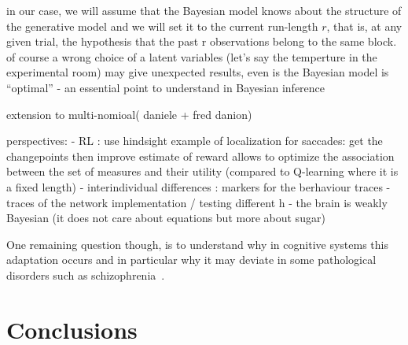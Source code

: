 \documentclass[12pt,english]{article}%
\newcommand{\citep}[1]{\parencite{#1}}
\begin{document}
in our case, we will assume that the Bayesian model knows about the structure of the generative model and we will set it to the current run-length $r$, that is, at any given trial, the hypothesis that the past r observations belong to the same block. of course a wrong choice of a latent variables (let's say the temperture in the experimental room) may give unexpected results, even is the Bayesian model is ``optimal'' - an essential point to understand in Bayesian inference

extension to multi-nomioal( daniele + fred danion)





perspectives:
- RL : use hindsight example of localization for saccades: get the changepoints then improve estimate of reward allows to optimize the association between the set of measures and their utility (compared to Q-learning where it is a fixed length)
- interindividual differences : markers for the berhaviour traces - traces of the network implementation / testing different h
- the brain is weakly Bayesian (it does not care about equations but more about sugar)


One remaining question though, is to understand why in cognitive systems
this adaptation occurs and
in particular why it may deviate
in some pathological disorders such as schizophrenia~\citep{Adams12}.


\section{Conclusions}
\end{document}
